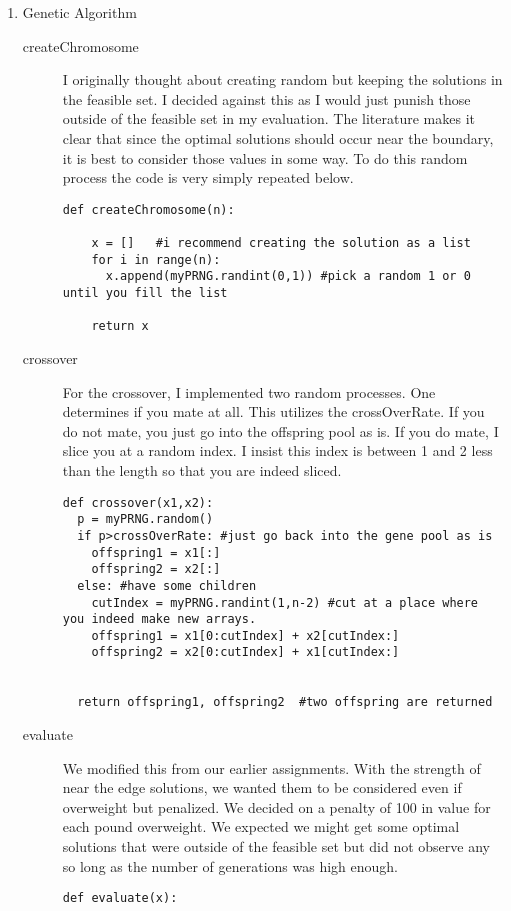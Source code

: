 \documentclass[11pt]{article}
\begin{document}
\begin{enumerate}
\begin{description}
\end{description}

\item Genetic Algorithm
\begin{description}
\item[createChromosome]  I originally thought about creating random but keeping the solutions in the feasible set.  I decided against this as I would just punish those outside of the feasible set in my evaluation.  The literature makes it clear that since the optimal solutions should occur near the boundary, it is best to consider those values in some way.  To do this random process the code is very simply repeated below.
\begin{verbatim}
def createChromosome(n):

    x = []   #i recommend creating the solution as a list
    for i in range(n):
      x.append(myPRNG.randint(0,1)) #pick a random 1 or 0 until you fill the list

    return x
\end{verbatim}

\item[crossover] For the crossover, I implemented two random processes.  One determines if you mate at all.  This utilizes the crossOverRate.  If you do not mate, you just go into the offspring pool as is.  If you do mate, I slice you at a random index.  I insist this index is between 1 and 2 less than the length so that you are indeed sliced.
\begin{verbatim}
def crossover(x1,x2):
  p = myPRNG.random()
  if p>crossOverRate: #just go back into the gene pool as is
    offspring1 = x1[:]
    offspring2 = x2[:]
  else: #have some children
    cutIndex = myPRNG.randint(1,n-2) #cut at a place where you indeed make new arrays. 
    offspring1 = x1[0:cutIndex] + x2[cutIndex:]
    offspring2 = x2[0:cutIndex] + x1[cutIndex:]


  return offspring1, offspring2  #two offspring are returned
\end{verbatim}
\item[evaluate]  We modified this from our earlier assignments.  With the strength of near the edge solutions, we wanted them to be considered even if overweight but penalized.  We decided on a penalty of 100 in value for each pound overweight.  We expected we might get some optimal solutions that were outside of the feasible set but did not observe any so long as the number of generations was high enough.
\begin{verbatim}
def evaluate(x):


\end{verbatim}
\end{description}
\end{enumerate}
\end{document}
